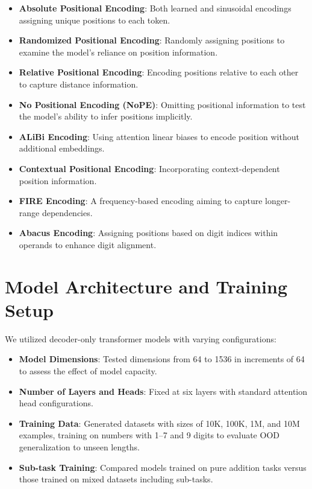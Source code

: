 \begin{itemize}
    \item \textbf{Absolute Positional Encoding}: Both learned and sinusoidal encodings assigning unique positions to each token.
    \item \textbf{Randomized Positional Encoding}: Randomly assigning positions to examine the model's reliance on position information.
    \item \textbf{Relative Positional Encoding}: Encoding positions relative to each other to capture distance information.
    \item \textbf{No Positional Encoding (NoPE)}: Omitting positional information to test the model's ability to infer positions implicitly.
    \item \textbf{ALiBi Encoding}: Using attention linear biases to encode position without additional embeddings.
    \item \textbf{Contextual Positional Encoding}: Incorporating context-dependent position information.
    \item \textbf{FIRE Encoding}: A frequency-based encoding aiming to capture longer-range dependencies.
    \item \textbf{Abacus Encoding}: Assigning positions based on digit indices within operands to enhance digit alignment.
\end{itemize}

\section{Model Architecture and Training Setup}

We utilized decoder-only transformer models with varying configurations:

\begin{itemize}
    \item \textbf{Model Dimensions}: Tested dimensions from 64 to 1536 in increments of 64 to assess the effect of model capacity.
    \item \textbf{Number of Layers and Heads}: Fixed at six layers with standard attention head configurations.
    \item \textbf{Training Data}: Generated datasets with sizes of 10K, 100K, 1M, and 10M examples, training on numbers with 1--7 and 9 digits to evaluate OOD generalization to unseen lengths.
    \item \textbf{Sub-task Training}: Compared models trained on pure addition tasks versus those trained on mixed datasets including sub-tasks.
\end{itemize}

